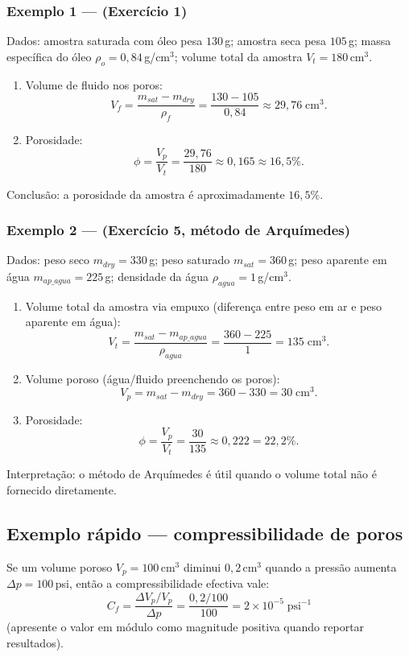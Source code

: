 \documentclass[11pt,a4paper]{article}
\begin{document}
\subsubsection{Exemplo 1 — (Exercício 1)}
Dados: amostra saturada com óleo pesa $130\,$g; amostra seca pesa $105\,$g; massa específica do óleo $\rho_o=0{,}84\,$g/cm$^3$; volume total da amostra $V_t=180\,$cm$^3$.

\begin{enumerate}
\item Volume de fluido nos poros:
$$
V_f = \dfrac{m_{sat}-m_{dry}}{\rho_f} = \dfrac{130-105}{0{,}84} \approx 29{,}76\;\text{cm}^3.
$$
\item Porosidade:
$$
\phi = \dfrac{V_p}{V_t} = \dfrac{29{,}76}{180} \approx 0{,}165 \approx 16{,}5\%.
$$
\end{enumerate}

Conclusão: a porosidade da amostra é aproximadamente $16{,}5\%$.

\subsubsection{Exemplo 2 — (Exercício 5, método de Arquímedes)}
Dados: peso seco $m_{dry}=330\,$g; peso saturado $m_{sat}=360\,$g; peso aparente em água $m_{ap\_agua}=225\,$g; densidade da água $\rho_{agua}=1\,$g/cm$^3$.

\begin{enumerate}
\item Volume total da amostra via empuxo (diferença entre peso em ar e peso aparente em água):
$$
V_t = \dfrac{m_{sat}-m_{ap\_agua}}{\rho_{agua}} = \dfrac{360-225}{1} = 135\;\text{cm}^3.
$$
\item Volume poroso (água/fluido preenchendo os poros):
$$
V_p = m_{sat}-m_{dry} = 360-330 = 30\;\text{cm}^3.
$$
\item Porosidade:
$$
\phi = \dfrac{V_p}{V_t} = \dfrac{30}{135} \approx 0{,}222 = 22{,}2\%.
$$
\end{enumerate}

Interpretação: o método de Arquímedes é útil quando o volume total não é fornecido diretamente.

\subsection{Exemplo rápido — compressibilidade de poros}
Se um volume poroso $V_p=100\,$cm$^3$ diminui $0{,}2\,$cm$^3$ quando a pressão aumenta $\Delta p=100\,$psi, então a compressibilidade efectiva vale:
$$
C_f = \dfrac{\Delta V_p/V_p}{\Delta p} = \dfrac{0{,}2/100}{100} = 2\times10^{-5}\;\text{psi}^{-1}
$$
(apresente o valor em módulo como magnitude positiva quando reportar resultados).
\end{document}
